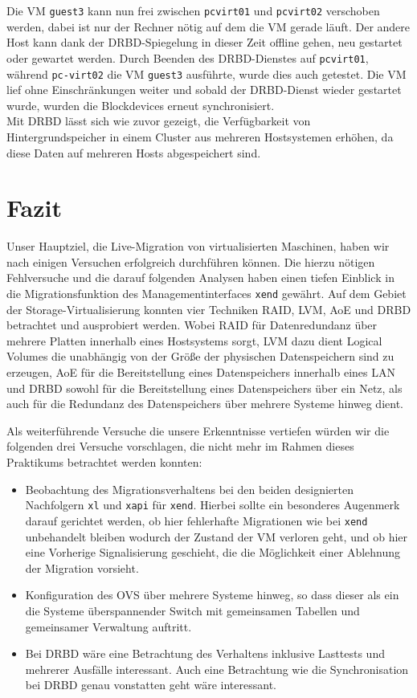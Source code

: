 Die VM \verb|guest3| kann nun frei zwischen \verb#pcvirt01# und \verb#pcvirt02# verschoben werden, dabei ist nur der Rechner nötig auf dem die VM gerade läuft. Der andere Host kann dank der DRBD-Spiegelung in dieser Zeit offline gehen, neu gestartet oder gewartet werden. Durch Beenden des DRBD-Dienstes auf \verb#pcvirt01#, während \verb#pc-virt02# die VM \verb#guest3# ausführte, wurde dies auch getestet. Die VM lief ohne Einschränkungen weiter und sobald der DRBD-Dienst wieder gestartet wurde, wurden die Blockdevices erneut synchronisiert.
\\
Mit DRBD lässt sich wie zuvor gezeigt, die Verfügbarkeit von Hintergrundspeicher in einem Cluster aus mehreren Hostsystemen erhöhen, da diese Daten auf mehreren Hosts abgespeichert sind.

\chapter{Fazit}
Unser Hauptziel, die Live-Migration von virtualisierten Maschinen, haben
wir nach einigen Versuchen erfolgreich durchführen können. Die hierzu nötigen Fehlversuche und die darauf folgenden Analysen haben einen tiefen Einblick in die Migrationsfunktion des Managementinterfaces \verb#xend# gewährt. Auf dem Gebiet der Storage-Virtualisierung konnten vier Techniken RAID, LVM, AoE und DRBD betrachtet und ausprobiert werden. Wobei RAID für Datenredundanz über mehrere Platten innerhalb eines Hostsystems sorgt, LVM dazu dient Logical Volumes die unabhängig von der Größe der physischen Datenspeichern sind zu erzeugen, AoE für die Bereitstellung eines Datenspeichers innerhalb eines LAN und DRBD sowohl für die Bereitstellung eines Datenspeichers über ein Netz, als auch für die Redundanz des Datenspeichers über mehrere Systeme hinweg dient.

Als weiterführende Versuche die unsere Erkenntnisse vertiefen würden wir die folgenden drei Versuche vorschlagen, die nicht mehr im Rahmen dieses Praktikums betrachtet werden konnten:
\begin{itemize}
	\item Beobachtung des Migrationsverhaltens bei den beiden designierten Nachfolgern \verb#xl# und \verb#xapi# für \verb#xend#. Hierbei sollte ein besonderes Augenmerk darauf gerichtet werden, ob hier fehlerhafte Migrationen wie bei \verb#xend# unbehandelt bleiben wodurch der Zustand der VM verloren geht, und ob hier eine Vorherige Signalisierung geschieht, die die Möglichkeit einer Ablehnung der Migration vorsieht.
	\item Konfiguration des OVS über mehrere Systeme hinweg, so dass dieser als ein die Systeme überspannender Switch mit gemeinsamen Tabellen und gemeinsamer Verwaltung auftritt.
	\item Bei DRBD wäre eine Betrachtung des Verhaltens inklusive Lasttests und mehrerer Ausfälle interessant. Auch eine Betrachtung wie die Synchronisation bei DRBD genau vonstatten geht wäre interessant.  
\end{itemize}


